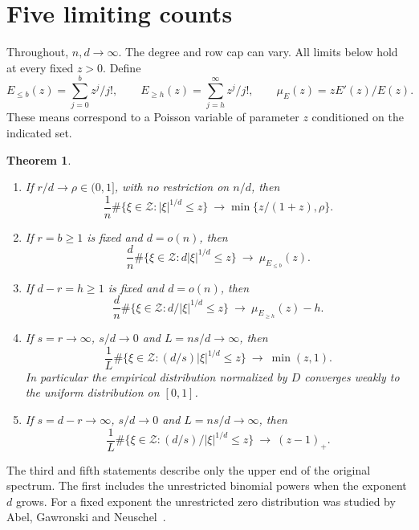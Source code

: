 \documentclass[11pt]{article}
\newtheorem{theorem}{Theorem}
\newcommand{\Z}{\mathcal{Z}}
\begin{document}
\section{Five limiting counts}
Throughout, $n,d\to\infty$. The degree and row cap can vary. All limits below hold at every fixed $z>0$. Define
\[
 E_{\le b}(z)=\sum_{j=0}^b z^j/j!,\qquad
 E_{\ge h}(z)=\sum_{j=h}^\infty z^j/j!,\qquad
 \mu_E(z)=zE'(z)/E(z).
\]
These means correspond to a Poisson variable of parameter $z$ conditioned on the indicated set.
\begin{theorem}\label{laws}
\leavevmode
\begin{enumerate}
\item If $r/d\to\rho\in(0,1]$, with no restriction on $n/d$, then
\[
 \frac1n\#\{\xi\in\Z: |\xi|^{1/d}\le z\}\ \longrightarrow \min\{z/(1+z),\rho\}.
\]
\item If $r=b\ge1$ is fixed and $d=o(n)$, then
\[
 \frac d n\#\{\xi\in\Z: d|\xi|^{1/d}\le z\}
 \ \longrightarrow\ \mu_{E_{\le b}}(z).
\]
\item If $d-r=h\ge1$ is fixed and $d=o(n)$, then
\[
 \frac d n\#\{\xi\in\Z: d/|\xi|^{1/d}\le z\}
 \ \longrightarrow\ \mu_{E_{\ge h}}(z)-h .
\]
\item If $s=r\to\infty$, $s/d\to0$ and $L=ns/d\to\infty$, then
\[
 \frac1L\#\{\xi\in\Z: (d/s)|\xi|^{1/d}\le z\}
 \ \longrightarrow\ \min(z,1).
\]
In particular the empirical distribution normalized by $D$ converges weakly to the uniform distribution on $[0,1]$.
\item If $s=d-r\to\infty$, $s/d\to0$ and $L=ns/d\to\infty$, then
\[
 \frac1L\#\{\xi\in\Z: (d/s)/|\xi|^{1/d}\le z\}
 \ \longrightarrow\ (z-1)_+ .
\]
\end{enumerate}
\end{theorem}
The third and fifth statements describe only the upper end of the original spectrum. The first includes the unrestricted binomial powers when the exponent $d$ grows. For a fixed exponent the unrestricted zero distribution was studied by Abel, Gawronski and Neuschel~\cite{agn}.
\end{document}
